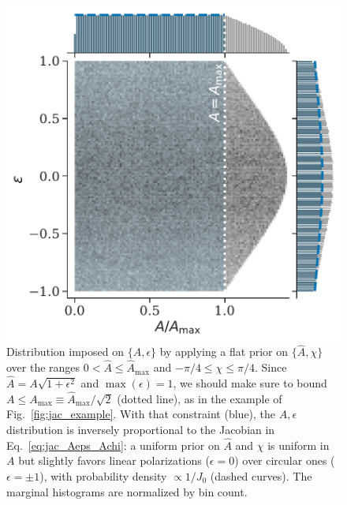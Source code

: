 \documentclass[aps,prd,twocolumn,superscriptaddress,preprintnumbers,floatfix,nofootinbib]{revtex4-2}
\newcommand*{\eq}[1]{Eq.~\eqref{eq:#1}}
\begin{document}
\begin{figure}
\includegraphics[width=0.8\columnwidth]{jac_Aeps_Achi}
\caption{Distribution imposed on $\{A,\epsilon\}$ by applying a flat prior on $\{\hat{A},\chi\}$ over the ranges $0 < \hat{A} \leq \hat{A}_{\max}$ and $-\pi/4 \leq \chi \leq \pi/4$.
Since $\hat{A} = A \sqrt{1+\epsilon^2}$ and $\max(\epsilon)= 1$, we should make sure to bound $A \leq  A_{\max} \equiv \hat{A}_{\max} /\sqrt{2}$ (dotted line), as in the example of Fig.~\ref{fig:jac_example}.
With that constraint (blue), the $A,\epsilon$ distribution is inversely proportional to the Jacobian in \eq{jac_Aeps_Achi}: a uniform prior on $\hat{A}$ and $\chi$ is uniform in $A$ but slightly favors linear polarizations ($\epsilon = 0$) over circular ones ($\epsilon = \pm 1$), with probability density $\propto 1/J_0$ (dashed curves). 
The marginal histograms are normalized by bin count.
}
\label{fig:jac_Aeps_Achi}
\end{figure}
\end{document}
